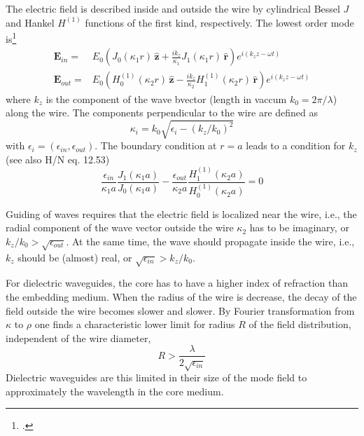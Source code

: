 The electric field is described inside and outside the wire by cylindrical Bessel $J$ and Hankel $H^{(1)}$ functions of the first kind, respectively. The lowest order mode is\footcite{Takahara}
\begin{align*}
  \mathbf{E}_{in} = & E_0 \left( J_0 (\kappa_1 r)\,  \mathbf{\hat{z}} + \frac{i k_z}{\kappa_1} J_1 (\kappa_1 r)  \, \mathbf{\hat{r}} \right) e^{i (k_z z - \omega t)} \\
  \mathbf{E}_{out} =& E_0 \left( H_0^{(1)} (\kappa_2 r) \,  \mathbf{\hat{z}} - \frac{i k_z}{\kappa_2} H_1^{(1)} (\kappa_2 r)  \, \mathbf{\hat{r}} \right) e^{i (k_z z - \omega t)}
\end{align*}
where $k_z$ is the component of the wave bvector (length in vaccum $k_0 = 2 \pi / \lambda$) along the wire. The components  perpendicular to the wire are defined as
\begin{equation}
  \kappa_i = k_0 \sqrt{\epsilon_i - (k_z / k_0)^2}
\end{equation}
with $\epsilon_i = (\epsilon_{in}, \epsilon_{out})$.
The boundary condition at $r=a$ leads to a condition for $k_z$ (see also H/N eq. 12.53)
\begin{equation}
  \frac{\epsilon_{in}}{\kappa_1 a} \frac{J_1(\kappa_1 a)}{J_0(\kappa_1 a)}
 -  \frac{\epsilon_{out}}{\kappa_2 a} \frac{H_1^{(1)}(\kappa_2 a)}{H_0^{(1)}(\kappa_2 a)}
 = 0
\end{equation}

Guiding of waves requires that the electric field is localized near the wire, i.e., the radial component of the wave vector outside the wire $\kappa_2$ has to be imaginary, or $k_z / k_0 > \sqrt{\epsilon_{out}}$. At the same time, the wave should propagate inside the wire, i.e., $k_z$ should be (almost) real, or $\sqrt{\epsilon_{in}} > k_z / k_0$. 

For dielectric waveguides, the core has to have a higher index of refraction than the embedding medium. When the radius of the wire is decrease, the decay of the field outside the wire becomes slower and slower.  By Fourier transformation from $\kappa$ to $\rho$ one finds a characteristic lower limit for radius $R$ of the field distribution, independent of the wire diameter,
\begin{equation}
  R > \frac{\lambda}{2 \sqrt{\epsilon_{in}}}
\end{equation}
Dielectric waveguides are this limited in their size of the mode field to approximately the wavelength in the core medium.

